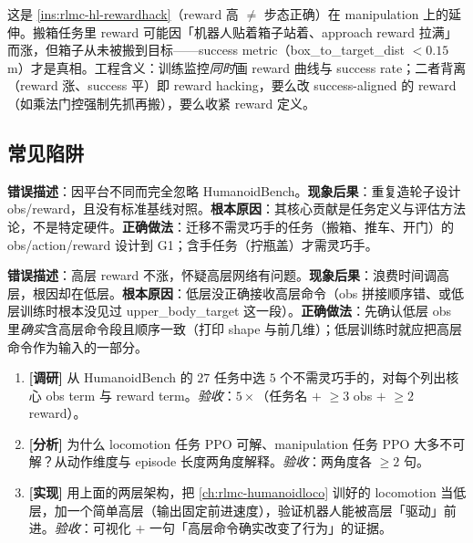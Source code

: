 \begin{insight}\label{ins:rlmc-wbc-metric}
这是 \cref{ins:rlmc-hl-rewardhack}（reward 高 $\neq$ 步态正确）在 manipulation 上的延伸。搬箱任务里 reward 可能因「机器人贴着箱子站着、approach reward 拉满」而涨，但箱子从未被搬到目标——success metric（box\_to\_target\_dist $<0.15$\,m）才是真相。工程含义：训练监控\emph{同时}画 reward 曲线与 success rate；二者背离（reward 涨、success 平）即 reward hacking，要么改 success-aligned 的 reward（如乘法门控强制先抓再搬），要么收紧 reward 定义。
\end{insight}

\subsection{常见陷阱}
\begin{pitfall}
\textbf{错误描述}：因平台不同而完全忽略 HumanoidBench。\textbf{现象后果}：重复造轮子设计 obs/reward，且没有标准基线对照。\textbf{根本原因}：其核心贡献是任务定义与评估方法论，不是特定硬件。\textbf{正确做法}：迁移不需灵巧手的任务（搬箱、推车、开门）的 obs/action/reward 设计到 G1；含手任务（拧瓶盖）才需灵巧手。
\end{pitfall}
\begin{pitfall}[分层 RL 高层「不学」]
\textbf{错误描述}：高层 reward 不涨，怀疑高层网络有问题。\textbf{现象后果}：浪费时间调高层，根因却在低层。\textbf{根本原因}：低层没正确接收高层命令（obs 拼接顺序错、或低层训练时根本没见过 upper\_body\_target 这一段）。\textbf{正确做法}：先确认低层 obs 里\emph{确实}含高层命令段且顺序一致（打印 shape 与前几维）；低层训练时就应把高层命令作为输入的一部分。
\end{pitfall}

\begin{practice}[本节动手]
\begin{enumerate}
  \item \textbf{[调研]} 从 HumanoidBench 的 $27$ 任务中选 $5$ 个不需灵巧手的，对每个列出核心 obs term 与 reward term。\emph{验收}：$5\times$（任务名 $+$ $\geq 3$ obs $+$ $\geq 2$ reward）。
  \item \textbf{[分析]} 为什么 locomotion 任务 PPO 可解、manipulation 任务 PPO 大多不可解？从动作维度与 episode 长度两角度解释。\emph{验收}：两角度各 $\geq 2$ 句。
  \item \textbf{[实现]} 用上面的两层架构，把 \cref{ch:rlmc-humanoidloco} 训好的 locomotion 当低层，加一个简单高层（输出固定前进速度），验证机器人能被高层「驱动」前进。\emph{验收}：可视化 $+$ 一句「高层命令确实改变了行为」的证据。
\end{enumerate}
\end{practice}


